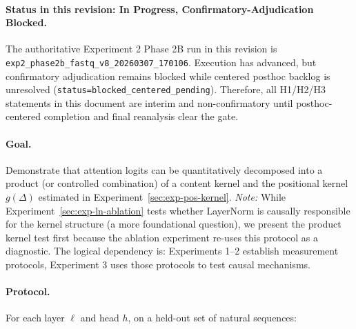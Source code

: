 \documentclass[11pt]{article}
\theoremstyle{definition}
\begin{document}
\paragraph{Status in this revision: \textbf{In Progress, Confirmatory-Adjudication Blocked}.}
The authoritative Experiment 2 Phase 2B run in this revision is \texttt{exp2\_phase2b\_fastq\_v8\_20260307\_170106}. Execution has advanced, but confirmatory adjudication remains blocked while centered posthoc backlog is unresolved (\texttt{status=blocked\_centered\_pending}). Therefore, all H1/H2/H3 statements in this document are interim and non-confirmatory until posthoc-centered completion and final reanalysis clear the gate.

\paragraph{Goal.}
Demonstrate that attention logits can be quantitatively decomposed into a product (or controlled combination) of a content kernel and the positional kernel \(g(\Delta)\) estimated in Experiment~\ref{sec:exp-pos-kernel}. \emph{Note:} While Experiment~\ref{sec:exp-ln-ablation} tests whether LayerNorm is causally responsible for the kernel structure (a more foundational question), we present the product kernel test first because the ablation experiment re-uses this protocol as a diagnostic. The logical dependency is: Experiments 1--2 establish measurement protocols, Experiment 3 uses those protocols to test causal mechanisms.

\paragraph{Protocol.}
For each layer \(\ell\) and head \(h\), on a held-out set of natural sequences:
\end{document}
